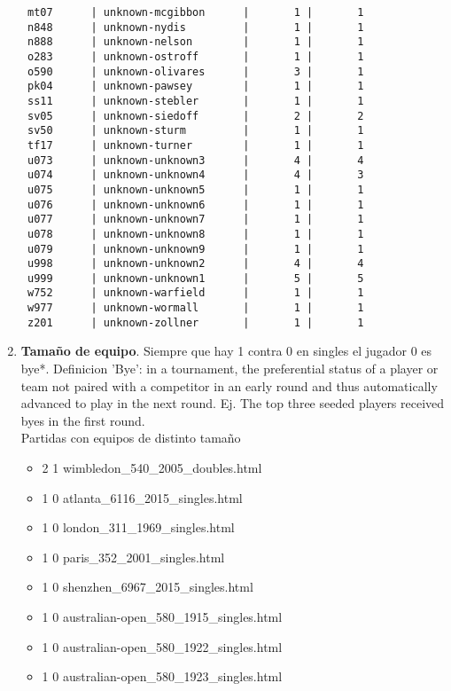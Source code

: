 \documentclass[a4paper,10pt]{article}
\begin{document}
\begin{enumerate}
\begin{verbatim}
 mt07      | unknown-mcgibbon      |       1 |       1
 n848      | unknown-nydis         |       1 |       1
 n888      | unknown-nelson        |       1 |       1
 o283      | unknown-ostroff       |       1 |       1
 o590      | unknown-olivares      |       3 |       1
 pk04      | unknown-pawsey        |       1 |       1
 ss11      | unknown-stebler       |       1 |       1
 sv05      | unknown-siedoff       |       2 |       2
 sv50      | unknown-sturm         |       1 |       1
 tf17      | unknown-turner        |       1 |       1
 u073      | unknown-unknown3      |       4 |       4
 u074      | unknown-unknown4      |       4 |       3
 u075      | unknown-unknown5      |       1 |       1
 u076      | unknown-unknown6      |       1 |       1
 u077      | unknown-unknown7      |       1 |       1
 u078      | unknown-unknown8      |       1 |       1
 u079      | unknown-unknown9      |       1 |       1
 u998      | unknown-unknown2      |       4 |       4
 u999      | unknown-unknown1      |       5 |       5
 w752      | unknown-warfield      |       1 |       1
 w977      | unknown-wormall       |       1 |       1
 z201      | unknown-zollner       |       1 |       1
\end{verbatim}

\item \textbf{Tama\~no de equipo}. Siempre que hay 1 contra 0 en singles el jugador 0 es bye*. Definicion 'Bye': in a tournament, the preferential status of a player or team not paired with a competitor in an early round and thus automatically advanced to play in the next round. Ej. The top three seeded players received byes in the first round.
\\
Partidas con equipos de distinto tama\~no
\begin{itemize}
 \item 2 1 wimbledon\_540\_2005\_doubles.html
 \item 1 0 atlanta\_6116\_2015\_singles.html
 \item 1 0 london\_311\_1969\_singles.html
 \item 1 0 paris\_352\_2001\_singles.html
 \item 1 0 shenzhen\_6967\_2015\_singles.html
 \item 1 0 australian-open\_580\_1915\_singles.html
 \item 1 0 australian-open\_580\_1922\_singles.html
 \item 1 0 australian-open\_580\_1923\_singles.html 
\end{itemize}


\end{enumerate}
\end{document}
